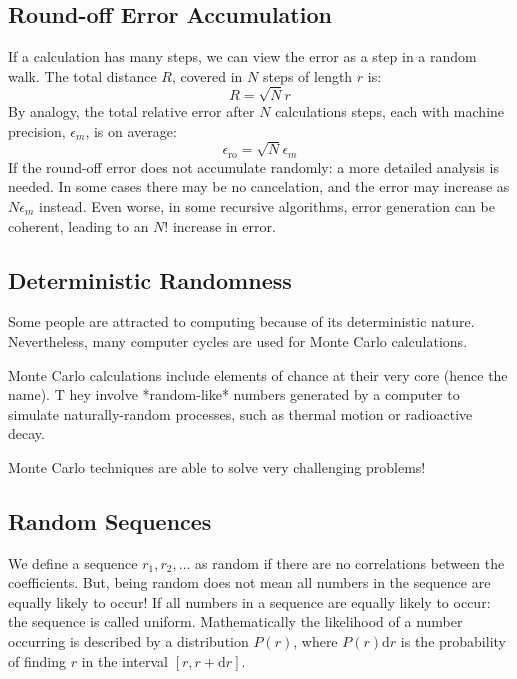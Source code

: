 \documentclass[../../../main.tex]{subfiles}
\begin{document}
\subsection{Round-off Error Accumulation}
If a calculation has many steps, we can view the error as a step in a random walk.
The total distance $R$, covered in $N$ steps of length $r$ is:
\begin{equation*}
    R = \sqrt{N} r
\end{equation*}
By analogy, the total relative error after $N$ calculations steps, each with machine precision, $\epsilon_m$, is on average:
\begin{equation*}
    \epsilon_\mathrm{ro} = \sqrt{N} \epsilon_m
\end{equation*}
If the round-off error does not accumulate randomly: a more detailed analysis is needed.
In some cases there may be no cancelation, and the error may increase as $N \epsilon_m$ instead.
Even worse, in some recursive algorithms, error generation can be coherent, leading to an $N!$ increase in error.

\subsection{Deterministic Randomness}

Some people are attracted to computing because of its deterministic nature.
Nevertheless, many computer cycles are used for Monte Carlo calculations.

Monte Carlo calculations include elements of chance at their very core (hence the name). T
hey involve *random-like* numbers generated by a computer to simulate naturally-random processes, such as thermal motion or radioactive decay.

Monte Carlo techniques are able to solve very challenging problems!

\subsection{Random Sequences}

We define a sequence $r_1, r_2,...$ as random if there are no correlations between the coefficients.
But, being random does not mean all numbers in the sequence are equally likely to occur!
If all numbers in a sequence are equally likely to occur: the sequence is called uniform.
Mathematically the likelihood of a number occurring is described by a distribution $P(r)$, where $P(r)\mathrm{d}r$ is the probability of finding $r$ in the interval $[r, r+\mathrm{d}r]$.
\end{document}
